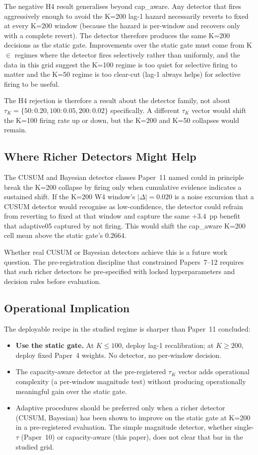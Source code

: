 The negative H4 result generalises beyond cap\_aware. Any detector
that fires aggressively enough to avoid the K=200 lag-1 hazard
necessarily reverts to fixed at every K=200 window (because the
hazard is per-window and recovers only with a complete revert). The
detector therefore produces the same K=200 decisions as the static
gate. Improvements over the static gate must come from K $\in$ regimes
where the detector fires selectively rather than uniformly, and
the data in this grid suggest the K=100 regime is too quiet for
selective firing to matter and the K=50 regime is too clear-cut
(lag-1 always helps) for selective firing to be useful.

The H4 rejection is therefore a result about the detector family,
not about $\tau_K = \{50: 0.20, 100: 0.05, 200: 0.02\}$ specifically.
A different $\tau_K$ vector would shift the K=100 firing rate up or
down, but the K=200 and K=50 collapses would remain.

\subsection{Where Richer Detectors Might Help}

The CUSUM and Bayesian detector classes Paper~11 named could in
principle break the K=200 collapse by firing only when cumulative
evidence indicates a sustained shift. If the K=200 W4 window's
$|\Delta| = 0.020$ is a noise excursion that a CUSUM detector would
recognise as low-confidence, the detector could refrain from
reverting to fixed at that window and capture the same $+3.4$~pp
benefit that adaptive05 captured by not firing. This would shift
the cap\_aware K=200 cell mean above the static gate's $0.2664$.

Whether real CUSUM or Bayesian detectors achieve this is a future
work question. The pre-registration discipline that constrained
Papers~7--12 requires that such richer detectors be pre-specified
with locked hyperparameters and decision rules before evaluation.

\subsection{Operational Implication}

The deployable recipe in the studied regime is sharper than Paper~11
concluded:
\begin{itemize}
\item \textbf{Use the static gate.} At $K \leq 100$, deploy lag-1
recalibration; at $K \geq 200$, deploy fixed Paper~4 weights. No
detector, no per-window decision.
\item The capacity-aware detector at the pre-registered $\tau_K$
vector adds operational complexity (a per-window magnitude test)
without producing operationally meaningful gain over the static gate.
\item Adaptive procedures should be preferred only when a richer
detector (CUSUM, Bayesian) has been shown to improve on the static
gate at K=200 in a pre-registered evaluation. The simple
magnitude detector, whether single-$\tau$ (Paper~10) or
capacity-aware (this paper), does not clear that bar in the
studied grid.
\end{itemize}
